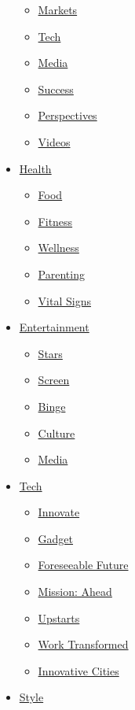 \begin{itemize}
  \begin{itemize}
  \tightlist
  \item
    \href{https://money.cnn.com/data/markets/}{Markets}
  \item
    \href{/business/tech}{Tech}
  \item
    \href{/business/media}{Media}
  \item
    \href{/business/success}{Success}
  \item
    \href{/business/perspectives}{Perspectives}
  \item
    \href{/business/videos}{Videos}
  \end{itemize}
\item
  \href{/health}{Health}

  \begin{itemize}
  \tightlist
  \item
    \href{/specials/health/food-diet}{Food}
  \item
    \href{/specials/health/fitness-excercise}{Fitness}
  \item
    \href{/specials/health/wellness}{Wellness}
  \item
    \href{/specials/health/parenting}{Parenting}
  \item
    \href{/specials/health/vital-signs}{Vital Signs}
  \end{itemize}
\item
  \href{/entertainment}{Entertainment}

  \begin{itemize}
  \tightlist
  \item
    \href{/entertainment/celebrities}{Stars}
  \item
    \href{/entertainment/movies}{Screen}
  \item
    \href{/entertainment/tv-shows}{Binge}
  \item
    \href{/entertainment/culture}{Culture}
  \item
    \href{/business/media}{Media}
  \end{itemize}
\item
  \href{/business/tech}{Tech}

  \begin{itemize}
  \tightlist
  \item
    \href{/specials/tech/innovate}{Innovate}
  \item
    \href{/specials/tech/gadget}{Gadget}
  \item
    \href{/specials/tech/foreseeable-future}{Foreseeable Future}
  \item
    \href{/specials/tech/mission-ahead}{Mission: Ahead}
  \item
    \href{/specials/tech/upstarts}{Upstarts}
  \item
    \href{/specials/tech/work-transformed}{Work Transformed}
  \item
    \href{/specials/tech/innovative-cities}{Innovative Cities}
  \end{itemize}
\item
  \href{/style}{Style}


\end{itemize}

